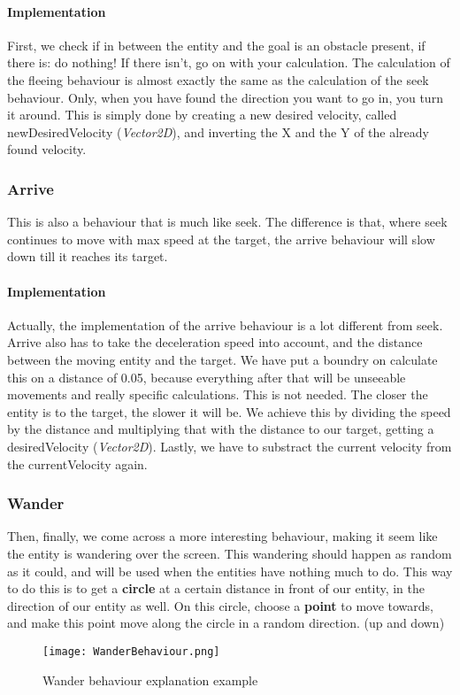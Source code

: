 \paragraph{Implementation}
First, we check if in between the entity and the goal is an obstacle present, if there is: do nothing!
If there isn't, go on with your calculation.
The calculation of the fleeing behaviour is almost exactly the same as the calculation of the seek behaviour.
Only, when you have found the direction you want to go in, you turn it around.
This is simply done by creating a new desired velocity, called newDesiredVelocity (\textit{Vector2D}), and inverting the X and the Y of the already found velocity.
\subsubsection{Arrive}
This is also a behaviour that is much like seek.
The difference is that, where seek continues to move with max speed at the target, the arrive behaviour will slow down till it reaches its target.
\paragraph{Implementation}
Actually, the implementation of the arrive behaviour is a lot different from seek.
Arrive also has to take the deceleration speed into account, and the distance between the moving entity and the target.
We have put a boundry on calculate this on a distance of 0.05, because everything after that will be unseeable movements and really specific calculations.
This is not needed.
The closer the entity is to the target, the slower it will be.
We achieve this by dividing the speed by the distance and multiplying that with the distance to our target, getting a desiredVelocity (\textit{Vector2D}).
Lastly, we have to substract the current velocity from the currentVelocity again.
\subsubsection{Wander}
Then, finally, we come across a more interesting behaviour, making it seem like the entity is wandering over the screen.
This wandering should happen as random as it could, and will be used when the entities have nothing much to do.
This way to do this is to get a \textbf{circle} at a certain distance in front of our entity, in the direction of our entity as well.
On this circle, choose a \textbf{point} to move towards, and make this point move along the circle in a random direction. (up and down)
\begin{figure}[h!]
    \begin{center}
        \texttt{[image: WanderBehaviour.png]}
    \end{center}
    \caption{Wander behaviour explanation example}
    \label{fig:WanderBehaviourExplanation}
\end{figure}
